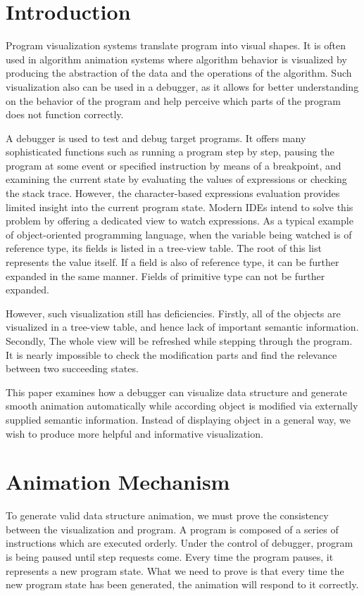 \documentclass [a4paper,11pt,fleqn]{article}
\begin{document}
\section {Introduction}

Program visualization systems translate program into visual shapes. It is often used in algorithm animation systems where algorithm behavior is visualized by producing the abstraction of the data and the operations of the algorithm. Such visualization also can be used in a debugger, as it allows for better understanding on the behavior of the program and help perceive which parts of the program does not function correctly.

A debugger is used to test and debug target programs. It offers many sophisticated functions such as running a program step by step, pausing the program at some event or specified instruction by means of a breakpoint, and examining the current state by evaluating the values of expressions or checking the stack trace. However, the character-based expressions evaluation provides limited insight into the current program state. Modern IDEs intend to solve this problem by offering a dedicated view to watch expressions. As a typical example of object-oriented programming language, when the variable being watched is of reference type, its fields is listed in a tree-view table. The root of this list represents the value itself. If a field is also of reference type, it can be further expanded in the same manner. Fields of primitive type can not be further expanded.

However, such visualization still has deficiencies. Firstly, all of the objects are visualized in a tree-view table, and hence lack of important semantic information. Secondly, The whole view will be refreshed while stepping through the program. It is nearly impossible to check the modification parts and find the relevance between two succeeding states.

This paper examines how a debugger can visualize data structure and generate smooth animation automatically while according object is modified via externally supplied semantic information. Instead of displaying object in a general way, we wish to produce more helpful and informative visualization.

\section {Animation Mechanism}
To generate valid data structure animation, we must prove the consistency between the visualization and program. A program is composed of a series of instructions which are executed orderly. Under the control of debugger, program is being paused until step requests come. Every time the program pauses, it represents a new program state. What we need to prove is that every time the new program state has been generated, the animation will respond to it correctly.
\end{document}

